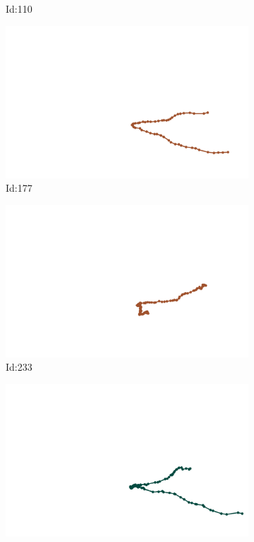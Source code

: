 \documentclass[12pt,twoside]{report}
\begin{document}
\begin{figure}
\begin{subfigure}[b]{0.20\textwidth}
\caption{Id:110}
\end{subfigure}
\begin{subfigure}[b]{0.20\textwidth}
\centering
\includegraphics[width=\textwidth]{../trajectories/177.png}
\caption{Id:177}
\end{subfigure}
\begin{subfigure}[b]{0.20\textwidth}
\centering
\includegraphics[width=\textwidth]{../trajectories/233.png}
\caption{Id:233}
\end{subfigure}
\begin{subfigure}[b]{0.20\textwidth}
\centering
\includegraphics[width=\textwidth]{../trajectories/269.png}

\end{subfigure}
\end{figure}
\end{document}
